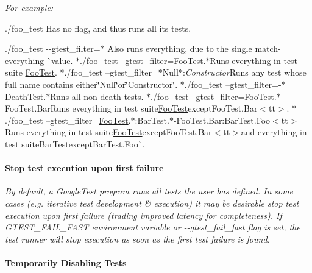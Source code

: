 {\itshape For example\+:}

{\itshape 
\begin{DoxyItemize}
\item {\ttfamily ./foo\+\_\+test} Has no flag, and thus runs all its tests.
\item {\ttfamily ./foo\+\_\+test -\/-\/gtest\+\_\+filter=$\ast$} Also runs everything, due to the single match-\/everything \`{}{\ttfamily value. $\ast$}./foo\+\_\+test --gtest\+\_\+filter=\mbox{\hyperlink{classFooTest}{Foo\+Test}}.$\ast${\ttfamily Runs everything in test suite }\mbox{\hyperlink{classFooTest}{Foo\+Test}}{\ttfamily . $\ast$}./foo\+\_\+test --gtest\+\_\+filter=$\ast$\+Null$\ast$\+:{\itshape Constructor}{\ttfamily Runs any test whose full name contains either}\char`\"{}\+Null\char`\"{}{\ttfamily or}\char`\"{}\+Constructor\char`\"{}{\ttfamily . $\ast$}./foo\+\_\+test --gtest\+\_\+filter=-\/$\ast$\+Death\+Test.$\ast${\ttfamily Runs all non-\/death tests. $\ast$}./foo\+\_\+test --gtest\+\_\+filter=\mbox{\hyperlink{classFooTest}{Foo\+Test}}.$\ast$-\/\+Foo\+Test.Bar{\ttfamily Runs everything in test suite}\mbox{\hyperlink{classFooTest}{Foo\+Test}}{\ttfamily except}Foo\+Test.\+Bar$<$tt$>$. $\ast$./foo\+\_\+test --gtest\+\_\+filter=\mbox{\hyperlink{classFooTest}{Foo\+Test}}.$\ast$\+:Bar\+Test.$\ast$-\/\+Foo\+Test.Bar\+:Bar\+Test.\+Foo$<$tt$>$Runs everything in test suite\mbox{\hyperlink{classFooTest}{Foo\+Test}}{\ttfamily except}Foo\+Test.\+Bar$<$tt$>$and everything in test suiteBar\+Test{\ttfamily except}Bar\+Test.\+Foo\`{}.
\end{DoxyItemize}}

{\itshape \paragraph*{Stop test execution upon first failure}}

{\itshape }

{\itshape By default, a Google\+Test program runs all tests the user has defined. In some cases (e.\+g. iterative test development \& execution) it may be desirable stop test execution upon first failure (trading improved latency for completeness). If {\ttfamily G\+T\+E\+S\+T\+\_\+\+F\+A\+I\+L\+\_\+\+F\+A\+ST} environment variable or {\ttfamily -\/-\/gtest\+\_\+fail\+\_\+fast} flag is set, the test runner will stop execution as soon as the first test failure is found.}

{\itshape \paragraph*{Temporarily Disabling Tests}}

